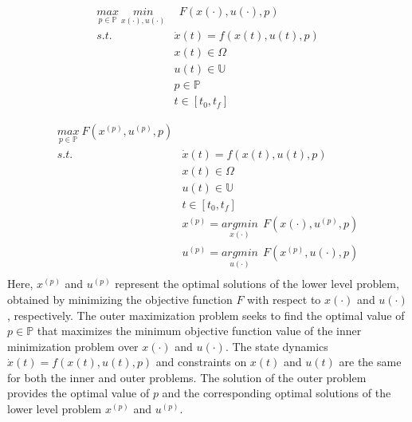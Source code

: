 \begin{equation}
	\begin{aligned}
		\underset{p  \in   \mathbb{P}}{max} \ \underset{x(\cdot), u(\cdot)}{min} &  \ \ F(x(\cdot), u(\cdot), p)\\ 
		s.t.\ \    &  \dot{x} (t) = f(x(t), u(t), p)\\ 
		& x(t) \in \Omega \\
		&  u(t) \in \mathbb{U}  \\
		& p  \in   \mathbb{P}  \\
		& t \in [t_0, t_f]
	\end{aligned}
	\label{maxmin}
\end{equation}

\begin{equation}
	\begin{aligned}
		\underset{p \in \mathbb{P}}{max} \ F(x^(p), u^(p), p)\\
		s.t.\ \ & \dot{x} (t) = f(x(t), u(t), p)\\
		& x(t) \in \Omega \\
		& u(t) \in \mathbb{U} \\
		& t \in [t_0, t_f]\\
		& x^(p) = \underset{x(\cdot)}{argmin}\ \ F(x(\cdot), u^(p), p)\\
		& u^(p) = \underset{u(\cdot)}{argmin}\ \ F(x^(p), u(\cdot), p)\\
	\end{aligned}
	\label{bilevel}
\end{equation}
Here, $x^(p)$ and $u^(p)$ represent the optimal solutions of the lower level problem, obtained by minimizing the objective function $F$ with respect to $x(\cdot)$ and $u(\cdot)$, respectively. The outer maximization problem seeks to find the optimal value of $p \in \mathbb{P}$ that maximizes the minimum objective function value of the inner minimization problem over $x(\cdot)$ and $u(\cdot)$. The state dynamics $\dot{x} (t) = f(x(t), u(t), p)$ and constraints on $x(t)$ and $u(t)$ are the same for both the inner and outer problems. The solution of the outer problem provides the optimal value of $p$ and the corresponding optimal solutions of the lower level problem $x^(p)$ and $u^(p)$.



